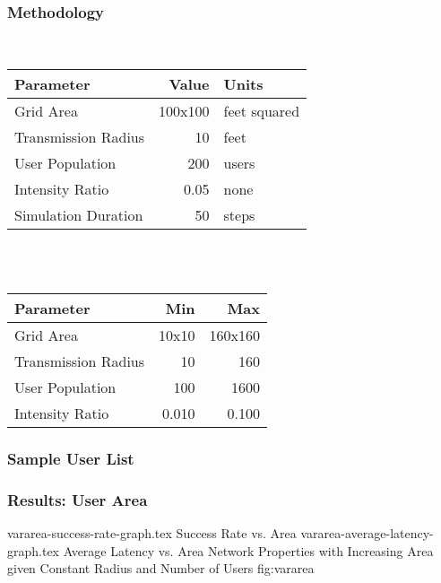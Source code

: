 \begin{frame}
    \frametitle{Methodology}
    \centering
    \\[0.25cm]
    \begin{tabular}{l|rl}
        \hline
        Parameter               & Value     & Units         \\
        \hline
        Grid Area               & 100x100   & feet squared  \\
        Transmission Radius     & 10        & feet          \\
        User Population         & 200       & users         \\
        \hline
        Intensity Ratio         & 0.05      & none          \\
        Simulation Duration     & 50        & steps         \\
        \hline
    \end{tabular}\\[0.5cm]
    
    \\[0.25cm]
    \begin{tabular}{l|rr}
        \hline
        Parameter               & Min   & Max       \\
        \hline
        Grid Area               & 10x10 & 160x160   \\
        Transmission Radius     & 10    & 160       \\
        User Population         & 100   & 1600      \\
        \hline
        Intensity Ratio         & 0.010 & 0.100     \\
        \hline
    \end{tabular}

\end{frame}

\begin{frame}
    \frametitle{Sample User List}
    

\end{frame}

\begin{frame}
    \frametitle{Results: User Area}
\sidebysidefigures
{vararea-success-rate-graph.tex}       {Success Rate vs. Area}
{vararea-average-latency-graph.tex}    {Average Latency vs. Area}
{Network Properties with Increasing Area given Constant Radius and Number of Users}
{fig:vararea}

\end{frame}

